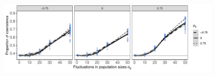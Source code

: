 \documentclass[12pt]{article}
\begin{document}
\begin{figure}[h]
  \centerline{\includegraphics[width=1\textwidth]{fluctuations_two.pdf}}
  \caption{ }
    \label{fig:fitness_deltas}
\end{figure}



\clearpage


\end{document}
